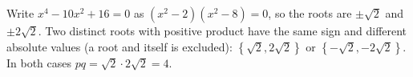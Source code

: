 Write $x^4-10x^2+16=0$ as $(x^2-2)(x^2-8)=0$, so the roots are $\pm\sqrt2$ and $\pm2\sqrt2$. Two distinct roots with positive product have the same sign and different absolute values (a root and itself is excluded): $\left\{\sqrt2,2\sqrt2\right\}$ or $\left\{-\sqrt2,-2\sqrt2\right\}$. In both cases $pq=\sqrt2\cdot2\sqrt2=\boxed{4}$.
